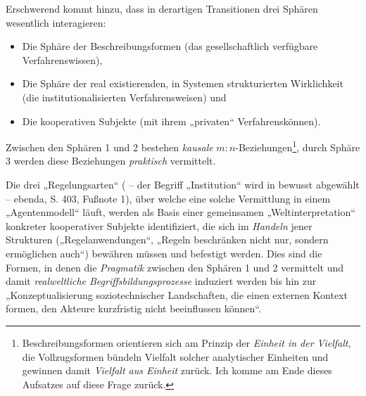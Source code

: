 \documentclass[12pt,a4paper]{article}
\begin{document}
Erschwerend kommt hinzu, dass in derartigen Transitionen drei Sphären
wesentlich interagieren:
\begin{itemize}
\item[1.] Die Sphäre der Beschreibungsformen (das gesellschaftlich verfügbare
  Verfahrenswissen),
\item[2.] Die Sphäre der real existierenden, in Systemen strukturierten
  Wirklichkeit (die institutionalisierten Verfahrensweisen) und
\item[3.] Die kooperativen Subjekte (mit ihrem „privaten“ Verfahrenskönnen).
\end{itemize}
Zwischen den Sphären 1 und 2 bestehen \emph{kausale}
$m:n$-Beziehungen\footnote{Beschreibungsformen orientieren sich am Prinzip der
  \emph{Einheit in der Vielfalt}, die Vollzugsformen bündeln Vielfalt solcher
  analytischer Einheiten und gewinnen damit \emph{Vielfalt aus Einheit}
  zurück.  Ich komme am Ende dieses Aufsatzes auf diese Frage zurück.}, durch
Sphäre 3 werden diese Beziehungen \emph{praktisch} vermittelt.

Die drei „Regelungsarten“ (\cite[3.3.]{Geels2007} -- der Begriff „Institution“
wird in \cite{Geels2007} bewusst abgewählt -- ebenda, S. 403, Fußnote 1), über
welche eine solche Vermittlung in einem „Agentenmodell“ läuft, werden als
Basis einer gemeinsamen „Weltinterpretation“ konkreter kooperativer Subjekte
identifiziert, die sich im \emph{Handeln} jener Strukturen
(„Regelanwendungen“, „Regeln beschränken nicht nur, sondern ermöglichen auch“)
bewähren müssen und befestigt werden.  Dies sind die Formen, in denen die
\emph{Pragmatik} zwischen den Sphären 1 und 2 vermittelt und damit
\emph{realweltliche Begriffsbildungsprozesse} induziert werden bis hin zur
„Konzeptualisierung soziotechnischer Landschaften, die einen externen Kontext
formen, den Akteure kurzfristig nicht beeinflussen können“.
\end{document}
